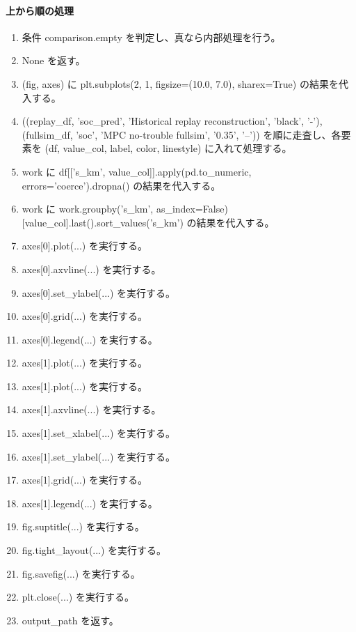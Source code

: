 \documentclass[a4paper,11pt]{article}
\begin{document}
            \paragraph{上から順の処理}
            \begin{enumerate}[leftmargin=1.8em]
            \item 条件 comparison.empty を判定し、真なら内部処理を行う。
\item   None を返す。
\item (fig, axes) に plt.subplots(2, 1, figsize=(10.0, 7.0), sharex=True) の結果を代入する。
\item ((replay\_df, 'soc\_pred', 'Historical replay reconstruction', 'black', '-'), (fullsim\_df, 'soc', 'MPC no-trouble fullsim', '0.35', '--')) を順に走査し、各要素を (df, value\_col, label, color, linestyle) に入れて処理する。
\item   work に df[['s\_km', value\_col]].apply(pd.to\_numeric, errors='coerce').dropna() の結果を代入する。
\item   work に work.groupby('s\_km', as\_index=False)[value\_col].last().sort\_values('s\_km') の結果を代入する。
\item   axes[0].plot(...) を実行する。
\item axes[0].axvline(...) を実行する。
\item axes[0].set\_ylabel(...) を実行する。
\item axes[0].grid(...) を実行する。
\item axes[0].legend(...) を実行する。
\item axes[1].plot(...) を実行する。
\item axes[1].plot(...) を実行する。
\item axes[1].axvline(...) を実行する。
\item axes[1].set\_xlabel(...) を実行する。
\item axes[1].set\_ylabel(...) を実行する。
\item axes[1].grid(...) を実行する。
\item axes[1].legend(...) を実行する。
\item fig.suptitle(...) を実行する。
\item fig.tight\_layout(...) を実行する。
\item fig.savefig(...) を実行する。
\item plt.close(...) を実行する。
\item output\_path を返す。
            \end{enumerate}
\end{document}
